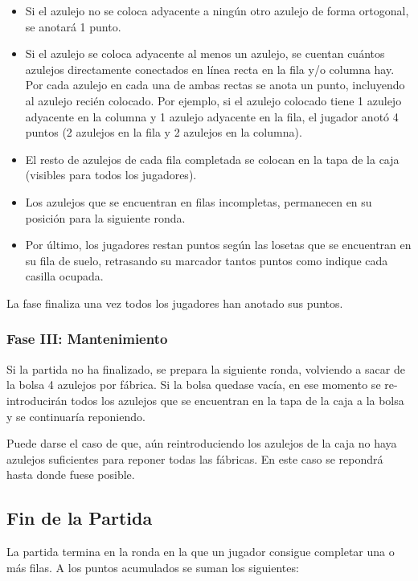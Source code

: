 \documentclass[a4paper,10pt,twocolumn]{article}
\begin{document}
	\begin{itemize}
		\item Si el azulejo no se coloca adyacente a ningún otro azulejo de forma ortogonal, se anotará 1 punto.
		\item Si el azulejo se coloca adyacente al menos un azulejo, se cuentan cuántos azulejos directamente conectados en línea recta en la fila y/o columna hay. Por cada azulejo en cada una de ambas rectas se anota un punto, incluyendo al azulejo recién colocado. Por ejemplo, si el azulejo colocado tiene 1 azulejo adyacente en la columna y 1 azulejo adyacente en la fila, el jugador anotó 4 puntos (2 azulejos en la fila y 2 azulejos en la columna).
		\item El resto de azulejos de cada fila completada se colocan en la tapa de la caja (visibles para todos los jugadores).
		\item Los azulejos que se encuentran en filas incompletas, permanecen en su posición para la siguiente ronda.
		\item 	Por último, los jugadores restan puntos según las losetas que se encuentran en su fila de suelo, retrasando su marcador tantos puntos como indique cada casilla ocupada.
	\end{itemize}

	La fase finaliza una vez todos los jugadores han anotado sus puntos.
	
	\subsubsection{Fase III: Mantenimiento}
	
	Si la partida no ha finalizado, se prepara la siguiente ronda, volviendo a sacar de la bolsa 4 azulejos por fábrica. Si la bolsa quedase vacía, en ese momento se re-introducirán todos los azulejos que se encuentran en la tapa de la caja a la bolsa y se continuaría reponiendo.
	
	Puede darse el caso de que, aún reintroduciendo los azulejos de la caja no haya azulejos suficientes para reponer todas las fábricas. En este caso se repondrá hasta donde fuese posible.
	
	\subsection{Fin de la Partida}
	
	La partida termina en la ronda en la que un jugador consigue completar una o más filas. A los puntos acumulados se suman los siguientes:
	
\end{document}

